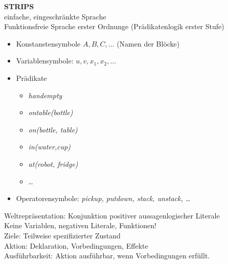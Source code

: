 \textbf{STRIPS}\\ 
einfache, eingeschränkte Sprache\\
Funktionsfreie Sprache erster Ordnunge (Prädikatenlogik erster Stufe)
\begin{itemize}
\item Konstanstensymbole \(A, B, C, \ldots\) (Namen der Blöcke)
\item Variablensymbole: \(u, v, x_1, x_2, \ldots\)
\item Prädikate
  \begin{itemize}
  \item \textit{handempty}
  \item \textit{ontable(bottle)}
  \item \textit{on(bottle, table)}
  \item \textit{in(water,cup)}
  \item \textit{at(robot, fridge)}
  \item \ldots
  \end{itemize}
\item Operatorensymbole: \textit{pickup, putdown, stack, unstack, \ldots}
\end{itemize}

Weltrepräsentation: Konjunktion positiver aussagenlogischer Literale\\
Keine Variablen, negativen Literale, Funktionen!\\

Ziele: Teilweise spezifizierter Zustand\\

Aktion: Deklaration, Vorbedingungen, Effekte\\

Ausführbarkeit: Aktion ausführbar, wenn Vorbedingungen erfüllt.





  